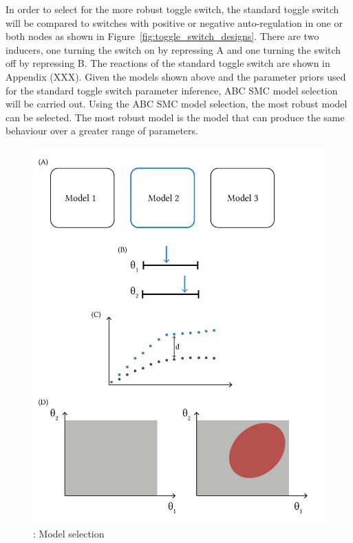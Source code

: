 
In order to select for the more robust toggle switch, the standard toggle switch will be compared to switches with positive or negative auto-regulation in one or both nodes as shown in Figure~\ref{fig:toggle_switch_designs}. There are two inducers, one turning the switch on by repressing A and one turning the switch off by repressing B. %
    The reactions of the standard toggle switch are shown in Appendix (XXX). Given the models shown above and the parameter priors used for the standard toggle switch parameter inference, ABC SMC model selection will be carried out. Using the ABC SMC model selection, the most robust model can be selected. The most robust model is the model that can produce the same behaviour over a greater range of parameters. 

\begin{figure}[htbp]
	\begin{center}
\includegraphics[scale=0.5]{chapterABCSysBio/images/model_selection.png}
\caption[LoF caption]{\label{fig:abc_model_sel}: Model selection}
\end{center}
\end{figure}
\clearpage

